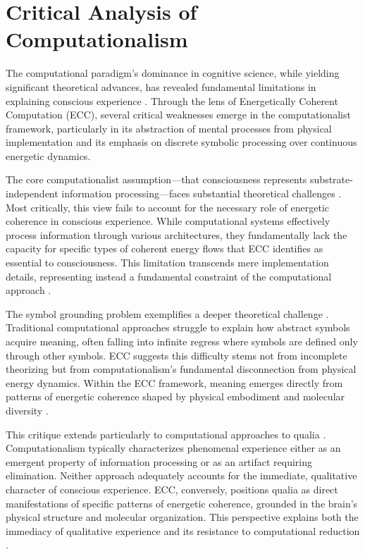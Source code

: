 \section{Critical Analysis of Computationalism}

The computational paradigm's dominance in cognitive science, while yielding significant theoretical advances, has revealed fundamental limitations in explaining conscious experience \cite{piccinini2015physical}. Through the lens of Energetically Coherent Computation (ECC), several critical weaknesses emerge in the computationalist framework, particularly in its abstraction of mental processes from physical implementation and its emphasis on discrete symbolic processing over continuous energetic dynamics.

The core computationalist assumption—that consciousness represents substrate-independent information processing—faces substantial theoretical challenges \cite{fodor2000mind}. Most critically, this view fails to account for the necessary role of energetic coherence in conscious experience. While computational systems effectively process information through various architectures, they fundamentally lack the capacity for specific types of coherent energy flows that ECC identifies as essential to consciousness. This limitation transcends mere implementation details, representing instead a fundamental constraint of the computational approach \cite{dreyfus1972what}.

The symbol grounding problem exemplifies a deeper theoretical challenge \cite{harnad1990symbol}. Traditional computational approaches struggle to explain how abstract symbols acquire meaning, often falling into infinite regress where symbols are defined only through other symbols. ECC suggests this difficulty stems not from incomplete theorizing but from computationalism's fundamental disconnection from physical energy dynamics. Within the ECC framework, meaning emerges directly from patterns of energetic coherence shaped by physical embodiment and molecular diversity \cite{bickhard1995foundational}.

This critique extends particularly to computational approaches to qualia \cite{searle1980minds}. Computationalism typically characterizes phenomenal experience either as an emergent property of information processing or as an artifact requiring elimination. Neither approach adequately accounts for the immediate, qualitative character of conscious experience. ECC, conversely, positions qualia as direct manifestations of specific patterns of energetic coherence, grounded in the brain's physical structure and molecular organization. This perspective explains both the immediacy of qualitative experience and its resistance to computational reduction \cite{smith2019promise}.

